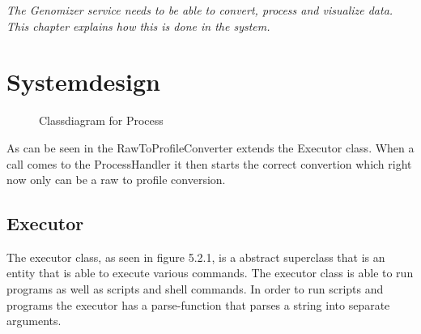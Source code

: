 \emph{The Genomizer service needs to be able to convert, process and visualize data. This chapter explains how this is done in the system.}

\section{Systemdesign}

\begin{figure}[h]
\caption{Classdiagram for Process}
\label{con_UML}
\end{figure}
	
As can be seen in  the RawToProfileConverter extends the Executor class. When a call comes to the ProcessHandler it then starts the correct convertion which right now only can be a raw to profile conversion.


\subsection{Executor}
The executor class, as seen in figure 5.2.1, is a abstract superclass that is an entity that is able to execute various commands. The executor class is able to run programs as well as scripts and shell commands. In order to run scripts and programs the executor has a parse-function that parses a string into separate arguments. \newline


